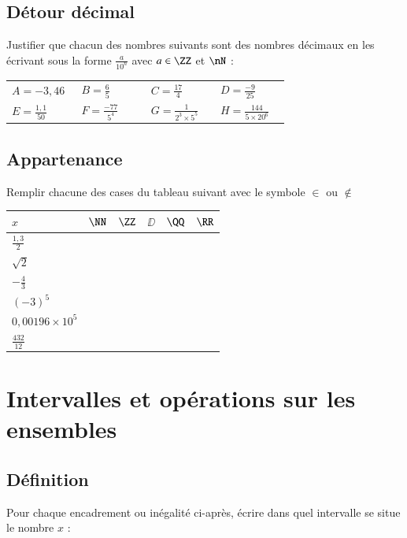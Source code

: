 \documentclass[oneside,12pt]{article}          %
\begin{document}
\subsection{Détour décimal}
Justifier que chacun des nombres suivants sont des nombres décimaux en les écrivant sous la forme $\frac{a}{10^n}$ avec $a\in\ZZ$ et $\nN$ :

\begin{tabular}{p{0.23\linewidth} p{0.23\linewidth} p{0.23\linewidth} p{0.23\linewidth}}
	$A=-3,46$ & $B=\frac{6}{5}$ & $C=\frac{17}{4}$ & $D=\frac{-9}{25}$ \\
	$E=\frac{1,1}{50}$ & $F=\frac{-77}{5^4}$ & $G=\frac{1}{2^3\times5^5}$ & $H=\frac{144}{5\times20^6}$
\end{tabular}



\subsection{Appartenance}
Remplir chacune des cases du tableau suivant avec le symbole $\in$ ou $\notin$

\begin{center}
\renewcommand{\arraystretch}{1.8}
\begin{tabular}{| P{3cm} || P{2cm} | P{2cm} | P{2cm} | P{2cm} | P{2cm} |} \hline
	$x$ & $\NN$ & $\ZZ$ & $\DD$ & $\QQ$ & $\RR$ \\ \hline \hline
	$\frac{1,3}{2}$ & & & & & \\ \hline
	$\sqrt{2}$ & & & & & \\ \hline
	$-\frac{4}{3}$ & & & & & \\ \hline
	$(-3)^5$ & & & & & \\ \hline
	$0,00196\times10^5$ & & & & & \\ \hline
	$\frac{432}{12}$ & & & & & \\ \hline
\end{tabular}
\end{center}



\section{Intervalles et opérations sur les ensembles}

\subsection{Définition}
Pour chaque encadrement ou inégalité ci-après, écrire dans quel intervalle se situe le nombre $x$ :
\end{document}
